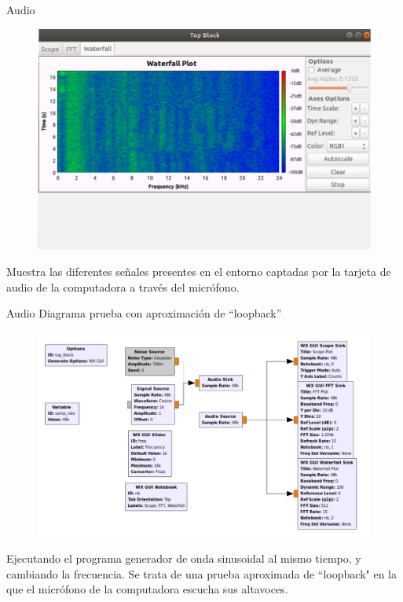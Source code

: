 \begin{frame}{Audio}

\begin{figure}
\begin{center}
\vspace{-8mm}
\includegraphics[width=\textwidth, height=0.65\paperheight]{lab3/pdf/lab3_8.pdf}
\end{center}
\end{figure}
\vspace{-2cm}
Muestra las diferentes señales presentes en el entorno captadas por la tarjeta de audio de la computadora a través del micrófono.

\end{frame}

\begin{frame}{Audio}
\scriptsize
Diagrama prueba con aproximación de “loopback”
\begin{figure}
\begin{center}
\vspace{-6mm}
\includegraphics[width=\textwidth, height=0.6\paperheight]{lab3/pdf/lab3_9.pdf}
\end{center}
\end{figure}
\vspace{-5mm}
\tiny
Ejecutando el programa generador de onda sinusoidal al mismo tiempo, y cambiando la frecuencia. Se trata de una prueba aproximada de “loopback" en la que el micrófono de la computadora escucha sus altavoces.

\end{frame}

